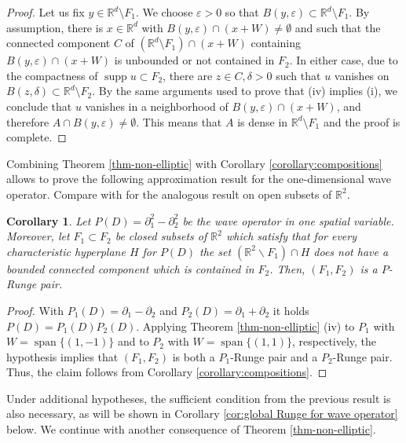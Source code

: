 \documentclass[10pt,leqno]{amsart}
\newtheorem{corollary}[prop]{Corollary}
\theoremstyle{definition}
\newcommand{\R}{\mathbb R}
\newcommand{\supp}{\operatorname{supp}}
\let\epsilon\varepsilon
\begin{document}
\begin{proof}
	Let us fix $y\in\R^d\setminus F_1$. We choose $\epsilon>0$ so that $B(y,\epsilon)\subset \R^d\setminus F_1$. By assumption, there is $x\in\R^d$ with $B(y,\epsilon)\cap (x+W)\neq\emptyset$ and such that the connected component $C$ of $(\R^d\setminus F_1)\cap (x+W)$ containing $B(y,\epsilon)\cap (x+W)$ is unbounded or not contained in $F_2$. In either case, due to the compactness of $\supp u\subset F_2$, there are $z\in C, \delta>0$ such that $u$ vanishes on $B(z,\delta)\subset\R^d\setminus F_2$. By the same arguments used to prove that (iv) implies (i), we conclude that $u$ vanishes in a neighborhood of $B(y,\epsilon)\cap (x+W)$, and therefore $A\cap B(y,\epsilon)\neq\emptyset$. This means that $A$ is dense in $\R^d\setminus F_1$ and the proof is complete. 
\end{proof}

Combining Theorem \ref{thm-non-elliptic} with Corollary \ref{corollary:compositions} allows to prove the following approximation result for the one-dimensional wave operator. Compare with \cite{DebKalmes2024} for the analogous result on open subsets of $\R^2$.

\begin{corollary}\label{corollary:one dimensional wave operator}
	Let $P(D)=\partial_1^2-\partial_2^2$ be the wave operator in one spatial variable. Moreover, let $F_1\subset F_2$ be closed subsets of $\R^2$ which satisfy that for every characteristic hyperplane $H$ for $P(D)$ the set $(\R^2\backslash F_1)\cap H$ does not have a bounded connected component which is contained in $F_2$. Then, $(F_1,F_2)$ is a $P$-Runge pair.
\end{corollary}

\begin{proof}
	With $P_1(D)=\partial_1-\partial_2$ and $P_2(D)=\partial_1+\partial_2$ it holds $P(D)=P_1(D)P_2(D)$. Applying Theorem \ref{thm-non-elliptic} (iv) to $P_1$ with $W=\operatorname{span}\{(1,-1)\}$ and to $P_2$ with $W=\operatorname{span}\{(1,1)\}$, respectively, the hypothesis implies that $(F_1, F_2)$ is both a $P_1$-Runge pair and a $P_2$-Runge pair. Thus, the claim follows from Corollary \ref{corollary:compositions}.
\end{proof}

Under additional hypotheses, the sufficient condition from the previous result is also necessary, as will be shown in Corollary \ref{cor:global Runge for wave operator} below. We continue with another consequence of Theorem \ref{thm-non-elliptic}.
\end{document}
